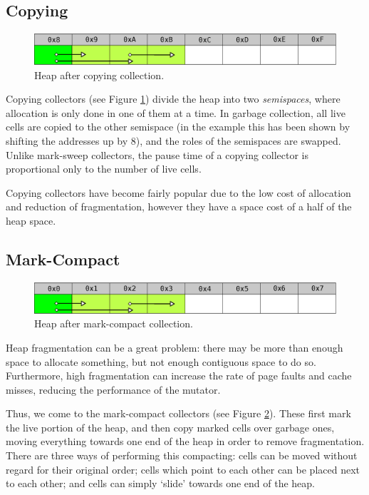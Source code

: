 \subsection{Copying}
\label{sec:lit-gc-copying}

\begin{figure}[t]
  \centering
  \includegraphics[width=\textwidth]{lit-gc-copying}
  \caption{Heap after copying collection.}
  \label{fig:lit-gc-copying}
\end{figure}

Copying collectors (see Figure \ref{fig:lit-gc-copying}) divide the
heap into two \textit{semispaces}, where allocation is only done in
one of them at a time. In garbage collection, all live cells are
copied to the other semispace (in the example this has been shown by
shifting the addresses up by 8), and the roles of the semispaces are
swapped\cite{Fenichel69}. Unlike mark-sweep collectors, the pause time
of a copying collector is proportional only to the number of live
cells\cite{Appel87}.

Copying collectors have become fairly popular due to the low cost of
allocation and reduction of fragmentation, however they have a space
cost of a half of the heap space\cite{GarbageCollection}.

\subsection{Mark-Compact}
\label{sec:lit-gc-markcompact}

\begin{figure}[t]
  \centering
  \includegraphics[width=\textwidth]{lit-gc-markcompact}
  \caption{Heap after mark-compact collection.}
  \label{fig:lit-gc-markcompact}
\end{figure}

Heap fragmentation can be a great problem: there may be more than
enough space to allocate something, but not enough contiguous space to
do so. Furthermore, high fragmentation can increase the rate of page
faults and cache misses, reducing the performance of the
mutator\cite{Zorn90}.

Thus, we come to the mark-compact collectors (see Figure
\ref{fig:lit-gc-markcompact}). These first mark the live portion of
the heap, and then copy marked cells over garbage ones, moving
everything towards one end of the heap in order to remove
fragmentation\cite{GarbageCollection}. There are three ways of
performing this compacting: cells can be moved without regard for
their original order; cells which point to each other can be placed
next to each other; and cells can simply `slide' towards one end of
the heap\cite{Cohen81}.

